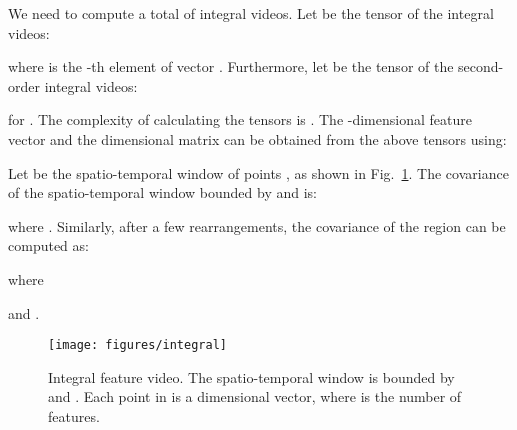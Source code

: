 \documentclass[10pt,twocolumn,letterpaper]{article}
\newcommand{\fig}[1]{\mbox{Fig.~\ref{#1}}}
\newcommand{\eqsize}{\footnotesize}
\begin{document}
We need to compute a total of {\eqsize } integral videos.
Let {\eqsize } be the {\eqsize } tensor of the integral videos:

\vspace{-1ex}
\eqsize

\normalsize

\noindent
where {\small } is the {\small }-th element of vector {\small }.
Furthermore, let {\small } be the
 {\small } tensor of the second-order integral videos:

\vspace{-2ex}
\eqsize

\normalsize

\noindent
for {\small }.
The complexity of calculating the tensors is {\small }.
The {\small }-dimensional feature vector {\small }
and the {\small } dimensional matrix {\small }
can be obtained from the above tensors using:

\noindent
\eqsize

\normalsize

Let {\eqsize }
be the spatio-temporal window of points
{\eqsize },
as shown in \fig{fig:integral}.
The covariance of the spatio-temporal window bounded by {\eqsize } and {\eqsize } is:

\vspace{-2ex}
\eqsize

\normalsize

\noindent
where {\eqsize }.
Similarly, after a few rearrangements,
the covariance of the region {\eqsize } can be computed as:

\noindent
\eqsize

\normalsize

\noindent
where
\vspace{-3ex}

\noindent
\eqsize

\normalsize

\noindent
and {\eqsize }.

\begin{figure}[!b]
  \vspace{-3ex}
  \centering
  \texttt{[image: figures/integral]}
\caption
    {
    \small
    Integral feature video.
    The spatio-temporal window {\eqsize } is bounded by {\eqsize } and {\eqsize }.
    Each point in {\eqsize } is a {\eqsize } dimensional vector,
    where {\eqsize } is the number of features.
    }
  \label{fig:integral}
\end{figure}
\end{document}
